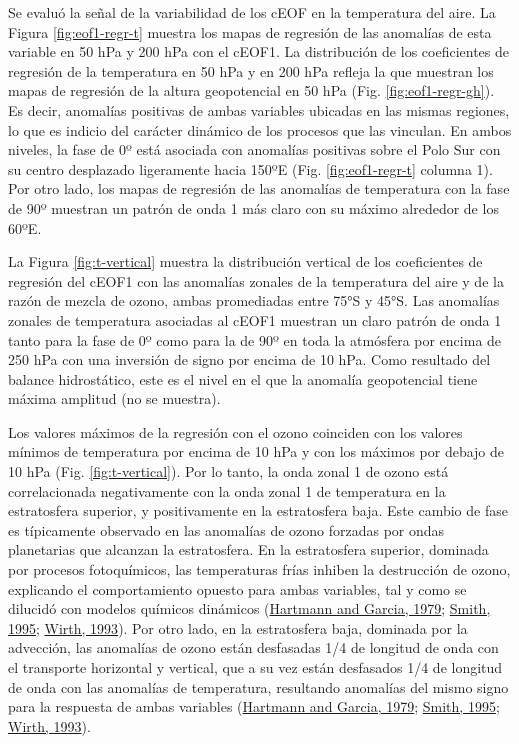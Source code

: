 \documentclass[12pt,oneside,a4paper]{reedthesis}
\begin{document}
Se evaluó la señal de la variabilidad de los cEOF en la temperatura del aire.
La Figura \ref{fig:eof1-regr-t} muestra los mapas de regresión de las anomalías de esta variable en 50 hPa y 200 hPa con el cEOF1.
La distribución de los coeficientes de regresión de la temperatura en 50 hPa y en 200 hPa refleja la que muestran los mapas de regresión de la altura geopotencial en 50 hPa (Fig. \ref{fig:eof1-regr-gh}).
Es decir, anomalías positivas de ambas variables ubicadas en las mismas regiones, lo que es indicio del carácter dinámico de los procesos que las vinculan.
En ambos niveles, la fase de 0º está asociada con anomalías positivas sobre el Polo Sur con su centro desplazado ligeramente hacia 150ºE (Fig. \ref{fig:eof1-regr-t} columna 1).
Por otro lado, los mapas de regresión de las anomalías de temperatura con la fase de 90º muestran un patrón de onda 1 más claro con su máximo alrededor de los 60ºE.

La Figura \ref{fig:t-vertical} muestra la distribución vertical de los coeficientes de regresión del cEOF1 con las anomalías zonales de la temperatura del aire y de la razón de mezcla de ozono, ambas promediadas entre 75°S y 45°S.
Las anomalías zonales de temperatura asociadas al cEOF1 muestran un claro patrón de onda 1 tanto para la fase de 0º como para la de 90º en toda la atmósfera por encima de 250 hPa con una inversión de signo por encima de 10 hPa.
Como resultado del balance hidrostático, este es el nivel en el que la anomalía geopotencial tiene máxima amplitud (no se muestra).

Los valores máximos de la regresión con el ozono coinciden con los valores mínimos de temperatura por encima de 10 hPa y con los máximos por debajo de 10 hPa (Fig. \ref{fig:t-vertical}).
Por lo tanto, la onda zonal 1 de ozono está correlacionada negativamente con la onda zonal 1 de temperatura en la estratosfera superior, y positivamente en la estratosfera baja.
Este cambio de fase es típicamente observado en las anomalías de ozono forzadas por ondas planetarias que alcanzan la estratosfera.
En la estratosfera superior, dominada por procesos fotoquímicos, las temperaturas frías inhiben la destrucción de ozono, explicando el comportamiento opuesto para ambas variables, tal y como se dilucidó con modelos químicos dinámicos (\protect\hyperlink{ref-hartmann1979}{Hartmann and Garcia, 1979}; \protect\hyperlink{ref-smith1995}{Smith, 1995}; \protect\hyperlink{ref-wirth1993}{Wirth, 1993}).
Por otro lado, en la estratosfera baja, dominada por la advección, las anomalías de ozono están desfasadas 1/4 de longitud de onda con el transporte horizontal y vertical, que a su vez están desfasados 1/4 de longitud de onda con las anomalías de temperatura, resultando anomalías del mismo signo para la respuesta de ambas variables (\protect\hyperlink{ref-hartmann1979}{Hartmann and Garcia, 1979}; \protect\hyperlink{ref-smith1995}{Smith, 1995}; \protect\hyperlink{ref-wirth1993}{Wirth, 1993}).
\end{document}
